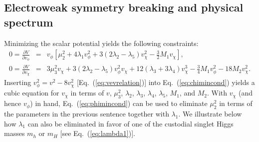 \documentclass[11pt]{article}
\begin{document}
\subsection{Electroweak symmetry breaking and physical spectrum}

Minimizing the scalar potential yields the following constraints:
\begin{eqnarray}
	0 = \frac{\partial V}{\partial v_{\phi}} &=& 
	v_{\phi} \left[ \mu_2^2 + 4 \lambda_1 v_{\phi}^2 
	+ 3 \left( 2 \lambda_2 - \lambda_5 \right) v_{\chi}^2 - \frac{3}{2} M_1 v_{\chi} \right], 
		\label{eq:phimincond} \\
	0 = \frac{\partial V}{\partial v_{\chi}} &=& 
	3 \mu_3^2 v_{\chi} + 3 \left( 2 \lambda_2 - \lambda_5 \right) v_{\phi}^2 v_{\chi}
	+ 12 \left( \lambda_3 + 3 \lambda_4 \right) v_{\chi}^3
	- \frac{3}{4} M_1 v_{\phi}^2 - 18 M_2 v_{\chi}^2.
	\label{eq:chimincond}
\end{eqnarray}
Inserting $v_{\phi}^2 = v^2 - 8 v_{\chi}^2$ [Eq.~(\ref{eq:vevrelation})] into Eq.~(\ref{eq:chimincond}) yields a cubic equation for $v_{\chi}$ in terms of $v$, $\mu_3^2$, $\lambda_2$, $\lambda_3$, $\lambda_4$, $\lambda_5$, $M_1$, and $M_2$.  With $v_{\chi}$ (and hence $v_{\phi}$) in hand, Eq.~(\ref{eq:phimincond}) can be used to eliminate $\mu_2^2$ in terms of the parameters in the previous sentence together with $\lambda_1$.  We illustrate below how $\lambda_1$ can also be eliminated in favor of one of the custodial singlet Higgs masses $m_h$ or $m_H$ [see Eq.~(\ref{eq:lambda1})].
\end{document}
